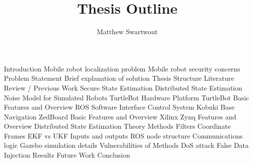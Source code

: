 \documentclass{article}
\begin{document}
\title{Thesis Outline}
\author{Matthew Swartwout}
\maketitle

\begin{outline}
\1 Introduction
    \2 Mobile robot localization problem
    \2 Mobile robot security concerns
    \2 Problem Statement
    \2 Brief explanation of solution
    \2 Thesis Structure
\1 Literature Review / Previous Work
    \2 Secure State Estimation
    \2 Distributed State Estimation
    \2 Noise Model for Simulated Robots
    \2 TurtleBot
\1 Hardware Platform
    \2 TurtleBot
        \3 Basic Features and Overview
        \3 ROS Software Interface
        \3 Control System
            \4 Kobuki Base
            \4 Navigation
    \2 ZedBoard
        \3 Basic Features and Overview
        \3 Xilinx Zynq Features and Overview
\1 Distributed State Estimation
    \2 Theory
    \2 Methods
        \3 Filters
            \4 Coordinate Frames
            \4 EKF vs UKF
            \4 Inputs and outputs
        \3 ROS node structure
        \3 Communications logic
        \3 Gazebo simulation details
    \2 Vulnerabilities of Methods
        \3 DoS attack
        \3 False Data Injection
\1 Results
\1 Future Work
\1 Conclusion
\end{outline}
\end{document}
